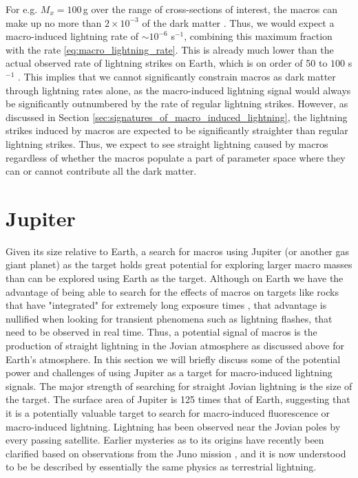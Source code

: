 \documentclass[%
 reprint,
 amsmath,amssymb,
 aps,
]{revtex4-2}
\begin{document}
        For e.g. $M_x = 100\,$g over the range of cross-sections of interest, the macros can make up no more than $2\times 10^{-3}$ of the dark matter \citep{Sidhu2019death}. Thus, we would expect a macro-induced lightning rate of $\sim 10^{-6}$ s$^{-1}$, combining this maximum fraction with the rate \eqref{eq:macro_lightning_rate}. This is already much lower than the actual observed rate of lightning strikes on Earth, which is on order of 50 to $100$ s$^{-1}$ \citep{Mackerras1998}. This implies that we cannot significantly constrain macros as dark matter through lightning rates alone, as the macro-induced lightning signal would always be significantly outnumbered by the rate of regular lightning strikes. However, as discussed in Section \ref{sec:signatures_of_macro_induced_lightning}, the lightning strikes induced by macros are expected to be significantly straighter than regular lightning strikes. Thus, we expect to see straight lightning caused by macros regardless of whether the macros populate a part of parameter space where they can or cannot contribute all the dark matter.

    


\section{Jupiter} %
\label{sec:jovian_bolides}

    Given its size relative to Earth, a search for macros using Jupiter (or another gas giant planet) as the target holds great potential for exploring larger macro masses than can be explored using Earth as the target. Although on Earth we have the advantage of being able to search for the effects of macros on targets like rocks that have "integrated" for extremely long exposure times \citep{Sidhu2019granite}, that advantage is nullified when looking for transient phenomena such as lightning flashes, that need to be observed in real time. Thus, a potential signal of macros is the production of straight lightning in the Jovian atmosphere as discussed above for Earth's atmosphere. In this section we will briefly discuss some of the potential power and challenges of using Jupiter as a target for macro-induced lightning signals. The major strength of searching for straight Jovian lightning is the size of the target. The surface area of Jupiter is 125 times that of Earth, suggesting that it is a potentially valuable target to search for macro-induced fluorescence or macro-induced lightning. Lightning has been observed near the Jovian poles by every passing satellite. Earlier mysteries as to its origins have recently been clarified based on observations from the Juno mission \citep{Brown2018}, and it is now understood to be be described by essentially the same physics as terrestrial lightning.
\end{document}
